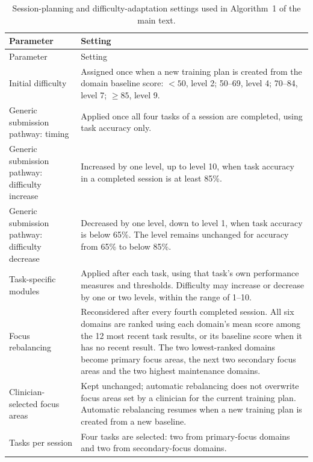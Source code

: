 \documentclass[11pt,a4paper]{article}
\begin{document}
\begin{longtable}{
>{\raggedright\arraybackslash}p{4.4cm}
>{\raggedright\arraybackslash}p{11.9cm}
}

\caption{Session-planning and difficulty-adaptation settings used in
Algorithm~1 of the main text.}
\label{tab:planning}\\

\toprule
Parameter & Setting \\
\midrule
\endfirsthead

\toprule
Parameter & Setting \\
\midrule
\endhead

Initial difficulty
& Assigned once when a new training plan is created from the domain baseline
score: $<50$, level 2; 50--69, level 4; 70--84, level 7;
$\geq85$, level 9. \\

Generic submission pathway: timing
& Applied once all four tasks of a session are completed, using task accuracy
only. \\

Generic submission pathway: difficulty increase
& Increased by one level, up to level 10, when task accuracy in a completed
session is at least 85\%. \\

Generic submission pathway: difficulty decrease
& Decreased by one level, down to level 1, when task accuracy is below 65\%.
The level remains unchanged for accuracy from 65\% to below 85\%. \\

Task-specific modules
& Applied after each task, using that task's own performance measures and
thresholds. Difficulty may increase or decrease by one or two levels,
within the range of 1--10. \\

Focus rebalancing
& Reconsidered after every fourth completed session. All six domains are
ranked using each domain's mean score among the 12 most recent task results,
or its baseline score when it has no recent result. The two lowest-ranked
domains become primary focus areas, the next two secondary focus areas and
the two highest maintenance domains. \\

Clinician-selected focus areas
& Kept unchanged; automatic rebalancing does not overwrite focus areas set by
a clinician for the current training plan. Automatic rebalancing resumes when
a new training plan is created from a new baseline. \\

Tasks per session
& Four tasks are selected: two from primary-focus domains and two from
secondary-focus domains. \\

\bottomrule

\end{longtable}
\end{document}
